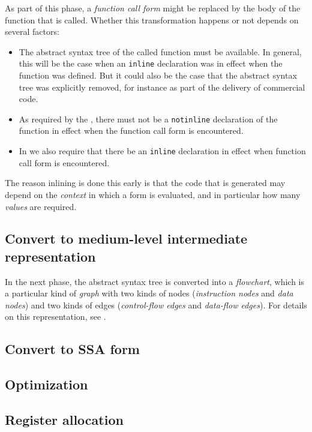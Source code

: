 As part of this phase, a \emph{function call form} might be replaced
by the body of the function that is called.  Whether this
transformation happens or not depends on several factors:

\begin{itemize}
\item The abstract syntax tree of the called function must be
  available.  In general, this will be the case when an
  \texttt{inline} declaration was in effect when the function was
  defined.  But it could also be the case that the abstract syntax
  tree was explicitly removed, for instance as part of the delivery of
  commercial code. 
\item As required by the \hs{}, there must not be a \texttt{notinline}
  declaration of the function in effect when the function call form is
  encountered.
\item In \sysname{} we also require that there be an \texttt{inline}
  declaration in effect when function call form is encountered.
\end{itemize}

The reason inlining is done this early is that the code that is
generated may depend on the \emph{context} in which a form is
evaluated, and in particular how many \emph{values} are required.  

\subsection{Convert to medium-level intermediate representation}

In the next phase, the abstract syntax tree is converted into a
\emph{flowchart}, which is a particular kind of \emph{graph} with two
kinds of nodes (\emph{instruction nodes} and \emph{data nodes}) and
two kinds of edges (\emph{control-flow edges} and \emph{data-flow
  edges}).  For details on this representation, see
.

\subsection{Convert to SSA form}

\subsection{Optimization}

\subsection{Register allocation}

